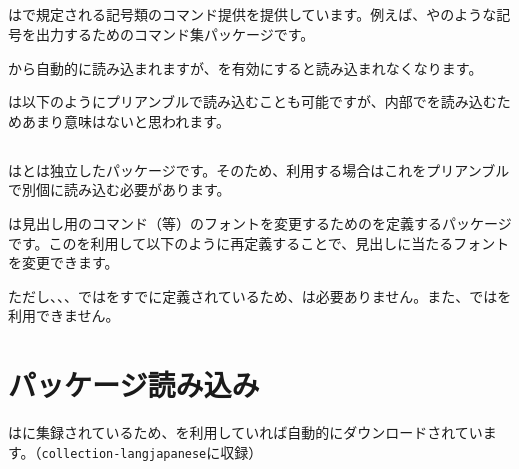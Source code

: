 \documentclass[../otf-unofficial-guide]{subfiles}
\begin{document}
\subsection{\texorpdfstring{}{ajmacrosパッケージ}}

は{\AdobeJapan}で規定される記号類のコマンド提供を提供しています。例えば、やのような記号を出力するためのコマンド集パッケージです。

から自動的に読み込まれますが、を有効にすると読み込まれなくなります。

は以下のようにプリアンブルで読み込むことも可能ですが、内部でを読み込むためあまり意味はないと思われます。

\begin{texsource}
\usepackage{ajmacros}
\end{texsource}

\subsection{\texorpdfstring{}{redeffontパッケージ}}

はとは独立したパッケージです。そのため、利用する場合はこれをプリアンブルで別個に読み込む必要があります。

\begin{texsource}
\usepackage{redeffont}
\end{texsource}

は見出し用のコマンド（等）のフォントを変更するためのを定義するパッケージです。このを利用して以下のように再定義することで、見出しに当たるフォントを変更できます。

\begin{texsource}
\renewcommand{\headfont}{\sffamily\bfseries}
\end{texsource}

ただし、、、ではをすでに定義されているため、は必要ありません。また、ではを利用できません。

\section{パッケージ読み込み}

は{\CTAN}に集録されているため、{\TeXLive}を利用していれば自動的にダウンロードされています。（\texttt{collection-langjapanese}に収録）
\end{document}
